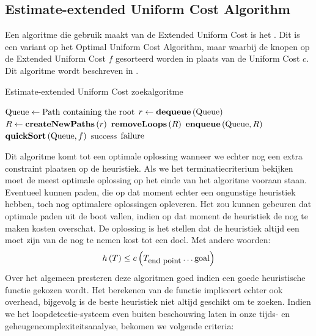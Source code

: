\subsection{Estimate-extended Uniform Cost Algorithm}
Een algoritme die gebruik maakt van de Extended Uniform Cost is het . Dit is een variant op het Optimal Uniform Cost Algorithm, maar waarbij de knopen op de Extended Uniform Cost $f$ gesorteerd worden in plaats van de Uniform Cost $c$. Dit algoritme wordt beschreven in .
\begin{algorithm}[htb]                      %
\caption{Estimate-extended Uniform Cost zoekalgoritme}          %
\label{alg:estimateExtendedUniformCost}                           %
\begin{algorithmic}[1]                    %
\STATE $\mbox{Queue}\leftarrow\mbox{Path containing the root}$
\WHILE{$\notempty{\queue}\wedge\neg\goalreached{\queue\left[0\right]}$}
\STATE $r\leftarrow\mbox{\bf dequeue}\left( \mbox{Queue} \right)$
\STATE $R\leftarrow\mbox{\bf createNewPaths}\left( r \right)$
\STATE $\mbox{\bf removeLoops}\left( R \right)$
\STATE $\mbox{\bf enqueue}\left( \mbox{Queue},R \right)$
\STATE $\mbox{\bf quickSort}\left( \mbox{Queue},f \right)$
\ENDWHILE
\IF{$\goalreached{\queue\left[0\right]}$}
\RETURN $\mbox{success}$
\ELSE
\RETURN $\mbox{failure}$
\ENDIF
\end{algorithmic}
\end{algorithm}
Dit algoritme komt tot een optimale oplossing wanneer we echter nog een extra constraint plaatsen op de heuristiek. Als we het terminatiecriterium bekijken moet de meest optimale oplossing op het einde van het algoritme vooraan staan. Eventueel kunnen paden, die op dat moment echter een ongunstige heuristiek hebben, toch nog optimalere oplossingen opleveren. Het zou kunnen gebeuren dat optimale paden uit de boot vallen, indien op dat moment de heuristiek de nog te maken kosten overschat. De oplossing is het stellen dat de heuristiek altijd een  moet zijn van de nog te nemen kost tot een doel. Met andere woorden:
\begin{equation}
h\left(T\right)\leq c\left(T_{\mbox{\small{end point}}}\ldots\mbox{goal}\right)
\end{equation}
Over het algemeen presteren deze algoritmen goed indien een goede heuristische functie gekozen wordt. Het berekenen van de functie impliceert echter ook overhead, bijgevolg is de beste heuristiek niet altijd geschikt om te zoeken. Indien we het loopdetectie-systeem even buiten beschouwing laten in onze tijds- en geheugencomplexiteitsanalyse, bekomen we volgende criteria:
